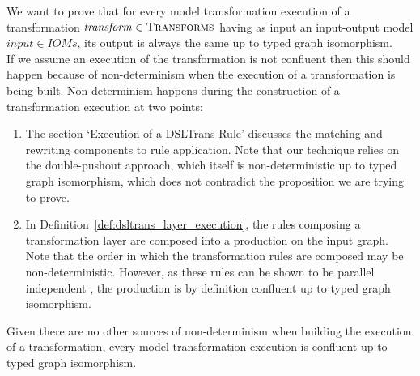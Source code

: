 \begin{pf}
We want to prove that for every model transformation execution of a transformation $\mathit{transform} \in \textsc{Transforms}$ having as input an input-output model $\mathit{input} \in \mathit{IOMs}$, its output is always the same up to typed graph isomorphism.\\


If we assume an execution of the transformation is not confluent then this should happen because of non-determinism when the execution of a transformation is being built. Non-determinism happens during the construction of a transformation execution at two points: 
\begin{enumerate}
\item The section `Execution of a DSLTrans Rule' discusses the matching and rewriting components to rule application. Note that our technique relies on the double-pushout approach, which itself is non-deterministic up to typed graph isomorphism, which does not contradict the proposition we are trying to prove. 


\item In Definition~\ref{def:dsltrans_layer_execution}, the rules composing a transformation layer are composed into a production on the input graph. Note that the order in which the transformation rules are composed may be non-deterministic. However, as these rules can be shown to be parallel independent , the production is by definition confluent up to typed graph isomorphism.

\end{enumerate}
Given there are no other sources of non-determinism when building the execution of a transformation, every model transformation execution is confluent up to typed graph isomorphism.
\end{pf}

